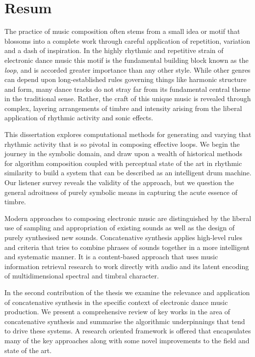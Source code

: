 
\chapter{Resum}

The practice of music composition often stems from a small idea or motif that blossoms into a complete work through careful application of repetition, variation and a dash of inspiration. In the highly rhythmic and repetitive strain of electronic dance music this motif is the fundamental building block known as the \textit{loop}, and is accorded greater importance than any other style. While other genres can depend upon long-established rules governing things like harmonic structure and form, many dance tracks do not stray far from its fundamental central theme in the traditional sense. Rather, the craft of this unique music is revealed through complex, layering arrangements of timbre and intensity arising from the liberal application of rhythmic activity and sonic effects.

This dissertation explores computational methods for generating and varying that rhythmic activity that is so pivotal in composing effective loops. We begin the journey in the symbolic domain, and draw upon a wealth of historical methods for algorithm composition coupled with perceptual state of the art in rhythmic similarity to build a system that can be described as an intelligent drum machine. Our listener survey reveals the validity of the approach, but we question the general adroitness of purely symbolic means in capturing the acute essence of timbre.

Modern approaches to composing electronic music are distinguished by the liberal use of sampling and appropriation of existing sounds as well as the design of purely synthesised new sounds. Concatenative synthesis applies high-level rules and criteria that tries to combine phrases of sounds together in a more intelligent and systematic manner. It is a  content-based approach that uses music information retrieval research to work directly with audio and its latent encoding of multidimensional spectral and timbral character.

In the second contribution of the thesis we examine the relevance and application of concatenative synthesis in the specific context of electronic dance music production. We present a comprehensive review of key works in the area of concatenative synthesis and summarise the algorithmic underpinnings that tend to drive these systems. A research oriented framework is offered that encapsulates many of the key approaches along with some novel improvements to the field and state of the art.

